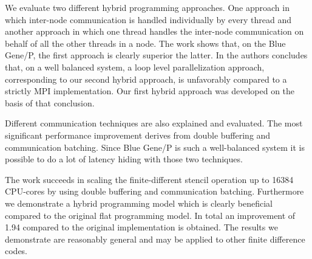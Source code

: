 \documentclass[a4paper,10pt]{article}
\begin{document}
We evaluate two different hybrid programming approaches. One approach in which inter-node communication is handled individually by every thread and another approach in which one thread handles the inter-node communication on behalf of all the other threads in a node. The work shows that, on the Blue Gene/P, the first approach is clearly superior the latter. In \cite{Cappello2000} the authors concludes that, on a well balanced system, a loop level parallelization approach, corresponding to our second hybrid approach, is unfavorably compared to a strictly MPI implementation. Our first hybrid approach was developed on the basis of that conclusion.

Different communication techniques are also explained and evaluated. The most significant performance improvement derives from double buffering and communication batching. Since Blue Gene/P is such a well-balanced system it is possible to do a lot of latency hiding with those two techniques.

The work succeeds in scaling the finite-different stencil operation up to 16384 CPU-cores by using double buffering and communication batching. Furthermore we demonstrate a hybrid programming model which is clearly beneficial compared to the original flat programming model. In total an improvement of 1.94 compared to the original implementation is obtained. The results we demonstrate are reasonably general and may be applied to other finite difference codes.




\end{document}
